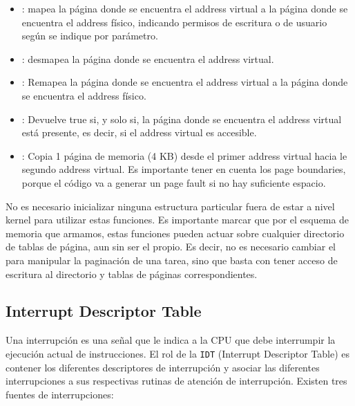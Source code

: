 \begin{itemize}
\item {}: mapea la página donde se encuentra el address virtual a la página donde se encuentra el address físico, indicando permisos de escritura o de usuario según se indique por parámetro.

\item {}: desmapea la página donde se encuentra el address virtual.

\item {}: Remapea la página donde se encuentra el address virtual a la página donde se encuentra el address físico.

\item {}: Devuelve true si, y solo si, la página donde se encuentra el address virtual está presente, es decir, si el address virtual es accesible.

\item {}: Copia 1 página de memoria (4 KB) desde el primer address virtual hacia le segundo address virtual. Es importante tener en cuenta los page boundaries, porque el código va a generar un page fault si no hay suficiente espacio.
\end{itemize}

No es necesario inicializar ninguna estructura particular fuera de estar a nivel kernel para utilizar estas funciones. Es importante marcar que por el esquema de memoria que armamos, estas funciones pueden actuar sobre cualquier directorio de tablas de página, aun sin ser el propio. Es decir, no es necesario cambiar el  para manipular la paginación de una tarea, sino que basta con tener acceso de escritura al directorio y tablas de páginas correspondientes.

\subsection{Interrupt Descriptor Table}

Una interrupción es una señal que le indica a la CPU que debe interrumpir la ejecución actual de instrucciones. El rol de la \texttt{IDT} (Interrupt Descriptor Table) es contener los diferentes descriptores de interrupción y asociar las diferentes interrupciones a sus respectivas rutinas de atención de interrupción. Existen tres fuentes de interrupciones:

